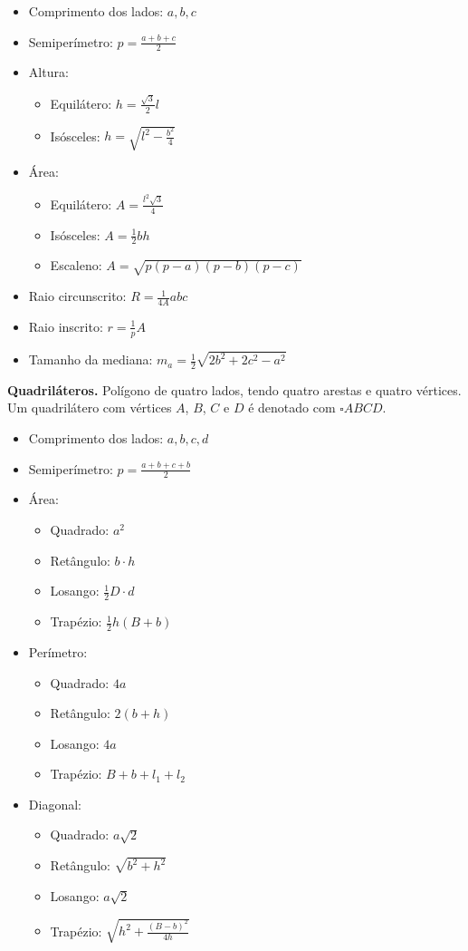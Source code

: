 	\begin{itemize}
		\item Comprimento dos lados: $a,b,c$
		\item Semiperímetro: $p = \frac{a+b+c}{2}$
		\item Altura:
		\begin{itemize}
			\item Equilátero: $h = \frac{\sqrt{3}}{2}l$
			\item Isósceles: $h = \sqrt{l^2 - \frac{b^2}{4}}$
		\end{itemize}
		\item Área:
		\begin{itemize}
			\item Equilátero: $A =\frac{l^2\sqrt{3}}{4}$
			\item Isósceles: $A =\frac{1}{2} bh$
			\item Escaleno: $A =\sqrt{p(p-a)(p-b)(p-c)}$
		\end{itemize}
		\item Raio circunscrito: $R = \frac{1}{4A}abc$
		\item Raio inscrito: $r = \frac{1}{p}A$
		\item Tamanho da mediana: $m_a = \frac{1}{2}\sqrt{2b^2+2c^2-a^2}$
	\end{itemize}

\noindent \textbf{Quadriláteros.} Polígono de quatro lados, tendo quatro arestas e quatro vértices. Um quadrilátero com vértices $A$, $B$, $C$ e $D$ é denotado com $\square ABCD$.

	\begin{itemize}
		\item Comprimento dos lados: $a,b,c,d$
		\item Semiperímetro: $p = \frac{a+b+c+b}{2}$
		\item Área:
		\begin{itemize}
			\item Quadrado: $a^2$
			\item Retângulo: $b\cdot h$
			\item Losango: $\frac{1}{2}D \cdot d$
			\item Trapézio: $\frac{1}{2}h(B+b)$
		\end{itemize}
		\item Perímetro:
		\begin{itemize}
			\item Quadrado: $4a$
			\item Retângulo: $2(b+h)$
			\item Losango: $4a$
			\item Trapézio: $B+b+l_1+l_2$
		\end{itemize}
		\item Diagonal:
		\begin{itemize}
			\item Quadrado: $a\sqrt{2}$
			\item Retângulo: $\sqrt{b^2 + h^2}$
			\item Losango: $a\sqrt{2}$
			\item Trapézio: $\sqrt{h^2 + \frac{(B-b)^2}{4h}}$
		\end{itemize}
	\end{itemize}

